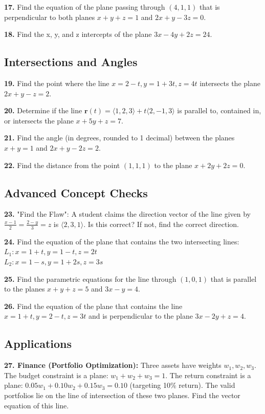 \documentclass[12pt]{article}
\begin{document}
\textbf{17.} Find the equation of the plane passing through $(4, 1, 1)$ that is perpendicular to both planes $x + y + z = 1$ and $2x + y - 3z = 0$.

\textbf{18.} Find the x, y, and z intercepts of the plane $3x - 4y + 2z = 24$.

\subsection*{Intersections and Angles}
\textbf{19.} Find the point where the line $x = 2 - t, y = 1 + 3t, z = 4t$ intersects the plane $2x + y - z = 2$.

\textbf{20.} Determine if the line $\mathbf{r}(t) = \langle 1, 2, 3 \rangle + t\langle 2, -1, 3 \rangle$ is parallel to, contained in, or intersects the plane $x + 5y + z = 7$.

\textbf{21.} Find the angle (in degrees, rounded to 1 decimal) between the planes $x + y = 1$ and $2x + y - 2z = 2$.

\textbf{22.} Find the distance from the point $(1, 1, 1)$ to the plane $x + 2y + 2z = 0$.

\subsection*{Advanced Concept Checks}
\textbf{23.} "Find the Flaw": A student claims the direction vector of the line given by $\frac{x-1}{2} = \frac{2-y}{3} = z$ is $\langle 2, 3, 1 \rangle$. Is this correct? If not, find the correct direction.

\textbf{24.} Find the equation of the plane that contains the two intersecting lines: \\
$L_1: x = 1 + t, y = 1 - t, z = 2t$ \\
$L_2: x = 1 - s, y = 1 + 2s, z = 3s$

\textbf{25.} Find the parametric equations for the line through $(1, 0, 1)$ that is parallel to the planes $x + y + z = 5$ and $3x - y = 4$.

\textbf{26.} Find the equation of the plane that contains the line $x = 1 + t, y = 2 - t, z = 3t$ and is perpendicular to the plane $3x - 2y + z = 4$.

\subsection*{Applications}
\textbf{27. Finance (Portfolio Optimization):} 
Three assets have weights $w_1, w_2, w_3$. 
The budget constraint is a plane: $w_1 + w_2 + w_3 = 1$.
The return constraint is a plane: $0.05w_1 + 0.10w_2 + 0.15w_3 = 0.10$ (targeting 10\% return).
The valid portfolios lie on the line of intersection of these two planes. Find the vector equation of this line.
\end{document}
